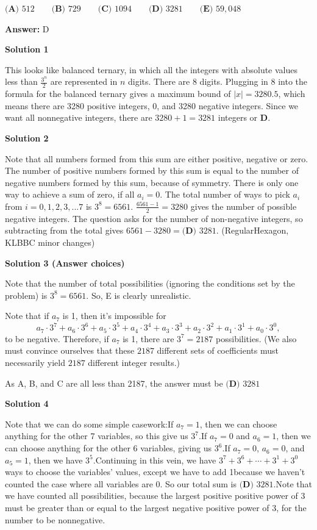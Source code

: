 \begin{enumerate}
 $\textbf{(A) } 512 \qquad \textbf{(B) } 729 \qquad \textbf{(C) } 1094 \qquad \textbf{(D) } 3281 \qquad  \textbf{(E) } 59,048$

 \textbf{Answer: }D



\textbf{Solution 1}

This looks like balanced ternary, in which all the integers with absolute values less than $\frac{3^n}{2}$ are represented in $n$ digits. There are 8 digits. Plugging in 8 into the formula for the balanced ternary gives a maximum bound of $|x|=3280.5$, which means there are 3280 positive integers, 0, and 3280 negative integers. Since we want all nonnegative integers, there are $3280+1=\boxed{3281}$ integers or $\boxed{\textbf{D}}$.

 



\textbf{Solution 2}

Note that all numbers formed from this sum are either positive, negative or zero. The number of positive numbers formed by this sum is equal to the number of negative numbers formed by this sum, because of symmetry. There is only one way to achieve a sum of zero, if all $a_i=0$. The total number of ways to pick $a_i$ from $i=0, 1, 2, 3, ... 7$ is $3^8=6561$. $\frac{6561-1}{2}=3280$ gives the number of possible negative integers. The question asks for the number of non-negative integers, so subtracting from the total gives $6561-3280=\boxed{\textbf{(D) } 3281}$. (RegularHexagon, KLBBC minor changes)

 



\textbf{Solution 3 (Answer choices)}

Note that the number of total possibilities (ignoring the conditions set by the problem) is $3^8=6561$. So, E is clearly unrealistic. 

 Note that if $a_7$ is 1, then it's impossible for 
 \[a_7\cdot3^7+a_6\cdot3^6+a_5\cdot3^5+a_4\cdot3^4+a_3\cdot3^3+a_2\cdot3^2+a_1\cdot3^1+a_0\cdot3^0,\] to be negative. Therefore, if $a_7$ is 1, there are $3^7=2187$ possibilities. (We also must convince ourselves that these $2187$ different sets of coefficients must necessarily yield $2187$ different integer results.)

 As A, B, and C are all less than 2187, the answer must be $\boxed{\textbf{(D) } 3281}$




\textbf{Solution 4}

Note that we can do some simple casework:If $a_7=1$, then we can choose anything for the other 7 variables, so this give us $3^7$.If $a_7=0$ and $a_6=1$, then we can choose anything for the other 6 variables, giving us $3^6$.If $a_7=0$, $a_6=0$, and $a_5=1$, then we have $3^5$.Continuing in this vein, we have $3^7+3^6+\cdots+3^1+3^0$ ways to choose the variables' values, except we have to add 1because we haven't counted the case where all variables are 0. So our total sum is $\boxed{\textbf{(D) } 3281}$.Note that we have counted all possibilities, because the largest positive positive power of 3 must be greater than or equal to the largest negative positive power of 3, for the number to be nonnegative.


\end{enumerate}
